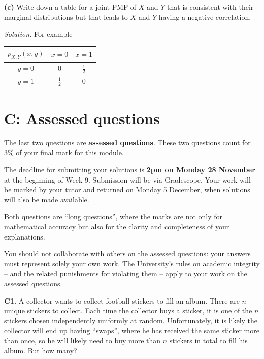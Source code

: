 \documentclass[
  a4paper,
]{book}
\theoremstyle{definition}
\theoremstyle{definition}
\theoremstyle{definition}
\theoremstyle{definition}
\theoremstyle{remark}
\begin{document}
\textbf{(c)} Write down a table for a joint PMF of \(X\) and \(Y\) that is consistent with their marginal distributions but that leads to \(X\) and \(Y\) having a negative correlation.

\begin{myanswers}

\emph{Solution.} For example

\begin{longtable}[]{@{}ccc@{}}
\toprule()
\(p_{X,Y}(x,y)\) & \(x = 0\) & \(x = 1\) \\
\midrule()
\endhead
\(y = 0\) & \(0\) & \(\frac12\) \\
\(y = 1\) & \(\frac12\) & \(0\) \\
\bottomrule()
\end{longtable}

\end{myanswers}

\hypertarget{P4-assessed}{%
\section*{C: Assessed questions}\label{P4-assessed}}

The last two questions are \textbf{assessed questions}. These two questions count for 3\% of your final mark for this module.

The deadline for submitting your solutions is \textbf{2pm on Monday 28 November} at the beginning of Week 9. Submission will be via Gradescope.
Your work will be marked by your tutor and returned on Monday 5 December, when solutions will also be made available.

Both questions are ``long questions'', where the marks are not only for mathematical accuracy but also for the clarity and completeness of your explanations.

You should not collaborate with others on the assessed questions: your answers must represent solely your own work. The University's rules on \href{https://library.leeds.ac.uk/info/1401/academic_skills/46/academic_integrity_and_plagiarism}{academic integrity} -- and the related punishments for violating them -- apply to your work on the assessed questions.

\textbf{C1.} A collector wants to collect football stickers to fill an album. There are \(n\) unique stickers to collect. Each time the collector buys a sticker, it is one of the \(n\) stickers chosen independently uniformly at random. Unfortunately, it is likely the collector will end up having ``swaps'', where he has received the same sticker more than once, so he will likely need to buy more than \(n\) stickers in total to fill his album. But how many?
\end{document}
